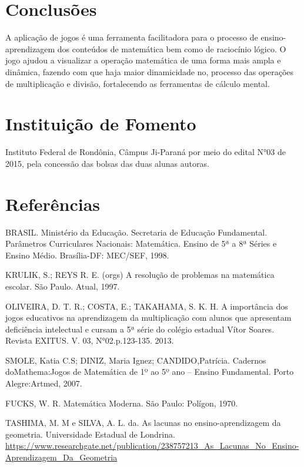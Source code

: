 \documentclass[article,12pt,onesidea,4paper,english,brazil]{abntex2}
\begin{document}
	\section*{Conclusões}
	
A aplicação de jogos é uma ferramenta facilitadora para o processo de ensino-aprendizagem dos conteúdos de matemática bem como de raciocínio lógico.
O jogo ajudou a visualizar a operação matemática de uma forma mais ampla e dinâmica, fazendo com que haja maior dinamicidade no, processo das operações de multiplicação e divisão, fortalecendo as ferramentas de cálculo mental.
	
	\section*{Instituição de Fomento}
	
	Instituto Federal de Rondônia, Câmpus Ji-Paraná por meio do edital N°03 de 2015, pela concessão das bolsas das duas alunas autoras.
	

	\section*{Referências}
	\sloppy
\noindent BRASIL. Ministério da Educação. Secretaria de Educação Fundamental. Parâmetros Curriculares Nacionais: Matemática. Ensino de 5ª a 8ª Séries e Ensino Médio. Brasília-DF: MEC/SEF, 1998.

\noindent KRULIK, S.; REYS R. E. (orgs) A resolução de problemas na matemática escolar. São Paulo. Atual, 1997.

\noindent OLIVEIRA, D. T. R.; COSTA, E.; TAKAHAMA, S. K. H. A importância dos jogos educativos na aprendizagem da multiplicação com alunos que apresentam deficiência intelectual e cursam a 5ª série do colégio estadual Vítor Soares. Revista EXITUS. V. 03, N°02.p.123-135. 2013.

\noindent SMOLE, Katia C.S; DINIZ, Maria Ignez; CANDIDO,Patrícia. Cadernos doMathema:Jogos de Matemática de 1º ao 5º ano – Ensino Fundamental. Porto Alegre:Artmed, 2007.

\noindent FUCKS, W. R. Matemática Moderna. São Paulo: Polígon, 1970.

\noindent TASHIMA, M. M e SILVA, A. L. da. As lacunas no ensino-aprendizagem da geometria. Universidade Estadual de Londrina. \url{https://www.researchgate.net/publication/238757213\_As\_Lacunas\_No\_Ensino-Aprendizagem\_Da\_Geometria}
	
\end{document}
